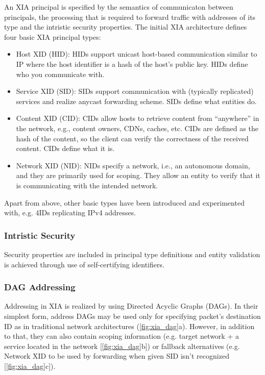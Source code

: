                 An XIA principal is specified by the semantics of communicaton between principals, the processing that is required to forward traffic with addresses of its type and the intristic security properties. The initial XIA architecture defines four basic XIA principal types:

                \begin{itemize}
                    \item Host XID (HID): HIDs support unicast host-based communication similar to IP where the host identifier is a hash of the host’s public key. HIDs define who you communicate with.
                    \item Service XID (SID): SIDs support communication with (typically replicated) services and realize anycast forwarding scheme. SIDs define what entities do.
                    \item Content XID (CID): CIDs allow hosts to retrieve content from ``anywhere'' in the network, e.g., content owners, CDNs, caches, etc. CIDs are defined as the hash of the content, so the client can verify the correctness of the received content. CIDs define what it is.
                    \item Network XID (NID): NIDs specify a network, i.e., an autonomous domain, and they are primarily used for scoping. They allow an entity to verify that it is communicating with the intended network.
                \end{itemize}

                Apart from above, other basic types have been introduced and experimented with, e.g. 4IDs replicating IPv4 addresses.

            \subsubsection{Intristic Security}

                Security properties are included in principal type definitions and entity validation is achieved through use of self-certifying identifiers.

            \subsubsection{DAG Addressing}

                Addressing in XIA is realized by using Directed Acyclic Graphs (DAGs). In their simplest form, address DAGs may be used only for specifying packet's destination ID as in traditional network architectures (\ref{fig:xia_dag}a). However, in addition to that, they can also contain scoping information (e.g. target network + a service located in the network [\ref{fig:xia_dag}b]) or fallback alternatives (e.g. Network XID to be used by forwarding when given SID isn't recognized [\ref{fig:xia_dag}c]).

